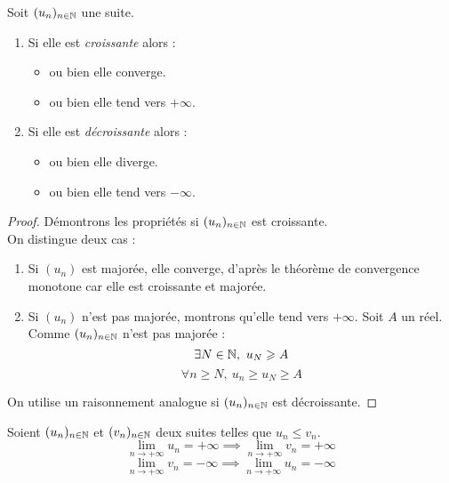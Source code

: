 \begin{theorem}
    Soit $(u_n)_{n \in \mathbb{N}}$ une suite. \\
    \begin{enumerate}
        \item Si elle est \emph{croissante} alors :
        \begin{multicols}{2}
            \begin{itemize}
                \item ou bien elle converge.
                \item ou bien elle tend vers $+\infty$.
            \end{itemize}
        \end{multicols}
        \item Si elle est \emph{décroissante} alors :
        \begin{multicols}{2}
            \begin{itemize}
                \item ou bien elle diverge.
                \item ou bien elle tend vers $-\infty$.
            \end{itemize}
        \end{multicols}
    \end{enumerate}
\end{theorem}

\begin{proof}
    Démontrons les propriétés si $(u_n)_{n \in \mathbb{N}}$ est croissante. \\ 
    On distingue deux cas :
    \begin{enumerate}
        \item Si $(u_n)$ est majorée, elle converge, d'après le théorème de convergence monotone car elle est croissante et majorée.
        \item Si $(u_n)$ n'est pas majorée, montrons qu'elle tend vers $+\infty$.
        Soit $A$ un réel. Comme $(u_n)_{n \in \mathbb{N}}$ n'est pas majorée :
        \[ \exists N \in \mathbb{N},\ u_N \geqslant A \]
        \[ \forall n \geq N,\ u_n \geq u_N \geq A \]
    \end{enumerate}
    On utilise un raisonnement analogue si $(u_n)_{n \in \mathbb{N}}$ est décroissante.
\end{proof}

\begin{theorem}
   Soient $(u_n)_{n \in \mathbb{N}}$ et $(v_n)_{n \in \mathbb{N}}$ deux suites telles que $u_n \leq v_n$.
   \[ \lim_{n \to +\infty} u_n = +\infty \implies \lim_{n \to +\infty} v_n = +\infty \]
   \[ \lim_{n \to +\infty} v_n = -\infty \implies \lim_{n \to +\infty} u_n = -\infty \]
\end{theorem}

